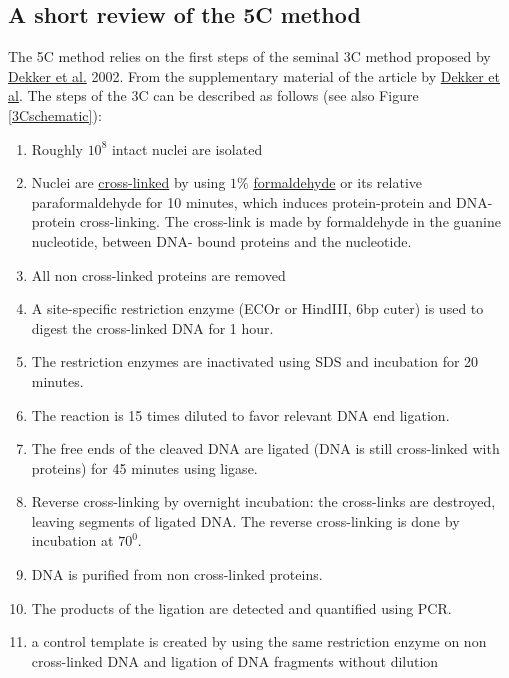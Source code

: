 \documentclass[12pt]{paper}
\begin{document}
\subsection{A short review of the 5C method}
The 5C method relies on the first steps of the seminal 3C method proposed by \href{http://www.sciencemag.org/content/295/5558/1306.full.pdf}{Dekker et al.} 2002. 
From the supplementary material of the article by \href{http://www.sciencemag.org/content/295/5558/1306/suppl/DC1}{Dekker et al}. The steps of the 3C can be described as follows (see also Figure \ref{3Cschematic}):
\begin{enumerate}
\item Roughly $10^8$ intact nuclei are isolated
\item Nuclei are \href{http://en.wikipedia.org/wiki/Crosslinking_of_DNA}{cross-linked} by using $1\%$ \href{http://en.wikipedia.org/wiki/Formaldehyde}{formaldehyde} or its relative paraformaldehyde for 10 minutes, which induces protein-protein and DNA-protein cross-linking. The cross-link is made by formaldehyde in the guanine nucleotide, between DNA- bound proteins and the nucleotide. 
\item All non cross-linked proteins are removed
\item A site-specific restriction enzyme (ECOr or HindIII, 6bp cuter) is used to digest the cross-linked DNA for 1 hour. 
\item The restriction enzymes are inactivated using SDS and incubation for 20 minutes.
\item The reaction is 15 times diluted to favor relevant DNA end ligation.
\item The free ends of the cleaved DNA are ligated (DNA is still cross-linked with proteins) for 45 minutes using ligase.
\item Reverse cross-linking by overnight incubation: the cross-links are destroyed, leaving segments of ligated DNA. The reverse cross-linking is done by incubation at $70^0$.
\item DNA is purified from non cross-linked proteins.
\item The products of the ligation are detected and quantified using PCR. 
\item a control template is created by using the same restriction enzyme on non cross-linked DNA and ligation of DNA fragments without dilution
\end{enumerate}
\end{document}
